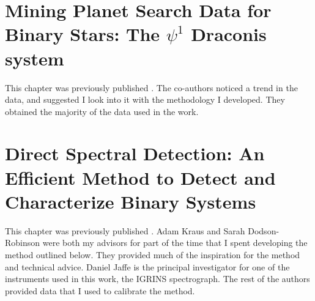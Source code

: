 \documentclass{utthesis}
\begin{document}


\chapter{Mining Planet Search Data for Binary Stars: The $\psi^1$ Draconis system}
This chapter was previously published \citep{Gullikson2015}. The co-authors noticed a trend in the data, and suggested I look into it with the methodology I developed. They obtained the majority of the data used in the work.




\chapter{Direct Spectral Detection: An Efficient Method to Detect and Characterize Binary Systems}
This chapter was previously published \citep{Gullikson2016}. Adam Kraus and Sarah Dodson-Robinson were both my advisors for part of the time that I spent developing the method outlined below. They provided much of the inspiration for the method and technical advice. Daniel Jaffe is the principal investigator for one of the instruments used in this work, the IGRINS spectrograph. The rest of the authors provided data that I used to calibrate the method.








\backmatter

\printindex

\cleardoublepage
{}

\end{document}
